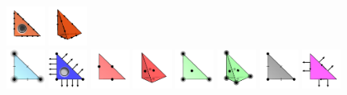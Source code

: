 \begin{frame}
  \includegraphics[width=1.3cm]{png/NED2_3_2d.png}
  \includegraphics[width=1.3cm]{png/NED2_1_3d.png} \\
  \includegraphics[width=1.3cm]{png/ARG5_2d.png}
  \includegraphics[width=1.3cm]{png/AW_2d.png}
  \includegraphics[width=1.3cm]{png/CR1_2d.png}
  \includegraphics[width=1.3cm]{png/CR1_3d.png}
  \includegraphics[width=1.3cm]{png/HER_2d.png}
  \includegraphics[width=1.3cm]{png/HER_3d.png}
  \includegraphics[width=1.3cm]{png/MOR_2d.png}
  \includegraphics[width=1.3cm]{png/MTW_2d.png}

\end{frame}
